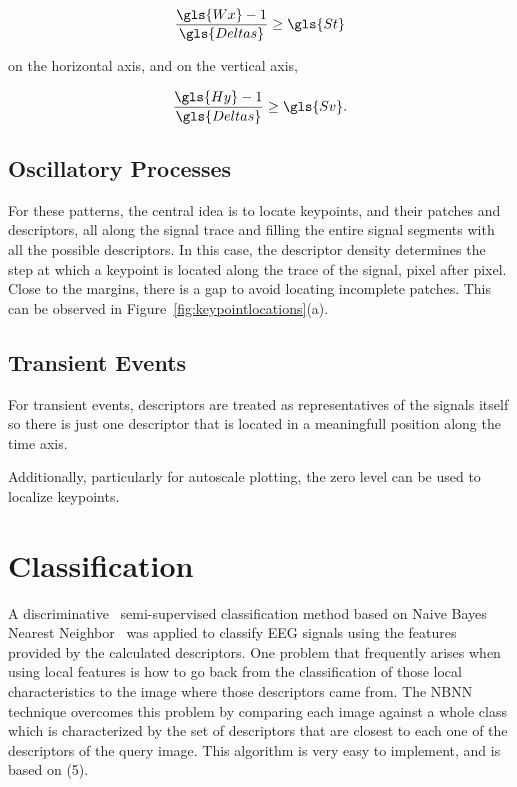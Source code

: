 \begin{equation}
\frac{\gls{Wx}-1}{\gls{Deltas}}  \geq \gls{St} 
\label{eq:restriction1}
\end{equation}

\noindent on the horizontal axis, and on the vertical axis, 

\begin{equation}
\frac{\gls{Hy}-1}{\gls{Deltas}}  \geq \gls{Sv}.
\label{eq:restriction2}
\end{equation}

\subsection{Oscillatory Processes}

For these patterns, the central idea is to locate keypoints, and their patches and descriptors, all along the signal trace and filling the entire signal segments with all the possible descriptors.  In this case, the descriptor density determines the step at which a keypoint is located along the trace of the signal, pixel after pixel.  Close to the margins, there is a gap to avoid locating incomplete patches.  This can be observed in Figure~\ref{fig:keypointlocations}(a).

\subsection{Transient Events}

For transient events, descriptors are treated as representatives of the signals itself so there is just one descriptor that is located in a meaningfull position along the time axis.

Additionally, particularly for autoscale plotting, the zero level can be used to localize keypoints.

\section{Classification}
\label{nbnn}

A discriminative~\cite{WolpawJonathanR2012} semi-supervised classification method based on Naive Bayes Nearest Neighbor~\cite{Boiman2008} was applied to classify EEG signals using the features provided by the calculated descriptors.
One problem that frequently arises when using local features is how to go back from the classification of those local characteristics to the image where those descriptors came from.
The NBNN technique overcomes this problem by comparing each image against a whole class which is characterized by the set of descriptors that are closest to each one of the descriptors of the query image. This algorithm is very easy to implement, and is based on (5).

